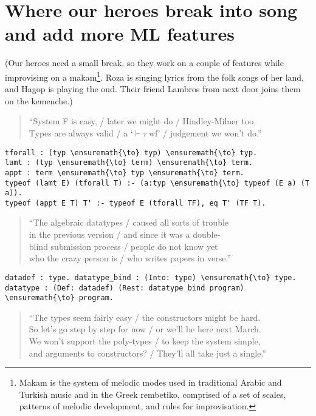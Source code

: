 \section{Where our heroes break into song and add more ML
features}\label{where-our-heroes-break-into-song-and-add-more-ml-features}

\begin{scenecomment}
(Our heroes need a small break, so they work on a couple of features while improvising on a makam\footnote{Makam is the system of melodic modes used in traditional Arabic and Turkish music and in the Greek rembetiko, comprised of a set of scales, patterns of melodic development, and rules for improvisation.}. Roza is singing lyrics from the folk songs of her land, and Hagop is playing the oud. Their friend Lambros from next door joins them on the kemenche.)
\end{scenecomment}

\begin{verse}
``System F is easy, / later we might do / Hindley-Milner too. \\
Types are always valid / a `$\vdash \tau \; \text{wf}$' / judgement we won't do.''
\end{verse}

\begin{verbatim}
tforall : (typ \ensuremath{\to} typ) \ensuremath{\to} typ.
lamt : (typ \ensuremath{\to} term) \ensuremath{\to} term.
appt : term \ensuremath{\to} typ \ensuremath{\to} term.
typeof (lamt E) (tforall T) :- (a:typ \ensuremath{\to} typeof (E a) (T a)).
typeof (appt E T) T' :- typeof E (tforall TF), eq T' (TF T).
\end{verbatim}

\begin{verse}
``The algebraic datatypes / caused all sorts of trouble \\
in the previous version / and since it was a double- \\
blind submission process / people do not know yet \\
who the crazy person is / who writes papers in verse.''
\end{verse}

\begin{verbatim}
datadef : type. datatype_bind : (Into: type) \ensuremath{\to} type.
datatype : (Def: datadef) (Rest: datatype_bind program) \ensuremath{\to} program.
\end{verbatim}

\begin{verse}
``The types seem fairly easy / the constructors might be hard. \\
So let's go step by step for now / or we'll be here next March. \\
We won't support the poly-types / to keep the system simple, \\
and arguments to constructors? / They'll all take just a single.''
\end{verse}

